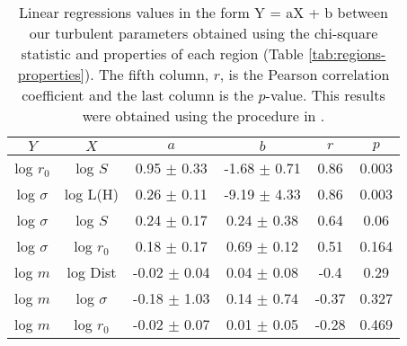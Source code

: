 \begin{table*}
\begin{center}
\caption{Linear regressions values in the form Y = aX + b between our turbulent parameters obtained using the chi-square statistic and properties of each region (Table \ref{tab:regions-properties}). The fifth column, $r$, is the Pearson correlation coefficient and the last column is the $p$-value. This results were obtained using the procedure in \citet{2007ApJ...665.1489K}.}
\begin{tabular}{cccccc}
\hline
            $Y$ &                   $X$ &                 $a$ &                 $b$ &       $r$ &      $p$ \\
\hline
    log $r_0$ &       log $S$ &   0.95 $\pm$ 0.33 &  -1.68 $\pm$ 0.71 &   0.86 &  0.003 \\
 log $\sigma$ &      log L(H) &   0.26 $\pm$ 0.11 &  -9.19 $\pm$ 4.33 &   0.86 &  0.003 \\
 log $\sigma$ &       log $S$ &   0.24 $\pm$ 0.17 &   0.24 $\pm$ 0.38 &   0.64 &   0.06 \\
 log $\sigma$ &   log $r_{0}$ &   0.18 $\pm$ 0.17 &   0.69 $\pm$ 0.12 &   0.51 &  0.164 \\
      log $m$ &      log Dist &  -0.02 $\pm$ 0.04 &   0.04 $\pm$ 0.08 &   -0.4 &   0.29 \\
      log $m$ &  log $\sigma$ &  -0.18 $\pm$ 1.03 &   0.14 $\pm$ 0.74 &  -0.37 &  0.327 \\
      log $m$ &   log $r_{0}$ &  -0.02 $\pm$ 0.07 &   0.01 $\pm$ 0.05 &  -0.28 &  0.469 \\
\bottomrule
\end{tabular}\label{tab:RestStats}
\end{center}
\end{table*}


